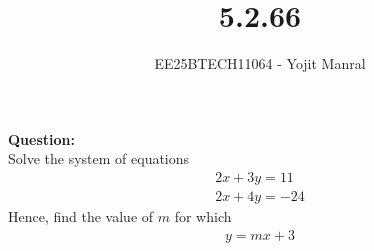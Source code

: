 \documentclass[journal]{IEEEtran}
\begin{document}

\vspace{3cm}

\title{5.2.66}
\author{EE25BTECH11064 - Yojit Manral}

\maketitle
{\let\newpage\relax\maketitle}
\renewcommand{\thefigure}{\theenumi}
\renewcommand{\thetable}{\theenumi}
\setlength{\intextsep}{10pt} %

\textbf{Question:}\\
Solve the system of equations
\begin{align}
    2x + 3y = 11 \\
    2x + 4y = -24
\end{align}
Hence, find the value of $m$ for which
\begin{align}
    y = mx + 3
\end{align}
\end{document}
